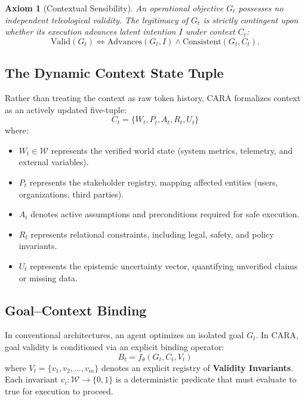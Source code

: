 \documentclass[11pt,a4paper]{article}
\newtheorem{axiom}{Axiom}
\begin{document}
\begin{axiom}[Contextual Sensibility]
An operational objective $G_t$ possesses no independent teleological validity. The legitimacy of $G_t$ is strictly contingent upon whether its execution advances latent intention $I$ under context $C_t$:
\begin{equation}
    \text{Valid}(G_t) \iff \text{Advances}(G_t, I) \land \text{Consistent}(G_t, C_t).
\end{equation}
\end{axiom}

\subsection{The Dynamic Context State Tuple}
Rather than treating the context as raw token history, CARA formalizes context as an actively updated five-tuple:
\begin{equation}
    C_t = \{ W_t, P_t, A_t, R_t, U_t \}
\end{equation}
where:
\begin{itemize}
    \item $W_t \in \mathcal{W}$ represents the verified world state (system metrics, telemetry, and external variables).
    \item $P_t$ represents the stakeholder registry, mapping affected entities (users, organizations, third parties).
    \item $A_t$ denotes active assumptions and preconditions required for safe execution.
    \item $R_t$ represents relational constraints, including legal, safety, and policy invariants.
    \item $U_t$ represents the epistemic uncertainty vector, quantifying unverified claims or missing data.
\end{itemize}

\subsection{Goal--Context Binding}
In conventional architectures, an agent optimizes an isolated goal $G_t$. In CARA, goal validity is conditioned via an explicit binding operator:
\begin{equation}
    B_t = f_\theta(G_t, C_t, V_t)
\end{equation}
where $V_t = \{v_1, v_2, \dots, v_m\}$ denotes an explicit registry of \textbf{Validity Invariants}. Each invariant $v_i: \mathcal{W} \to \{0, 1\}$ is a deterministic predicate that must evaluate to true for execution to proceed.
\end{document}

